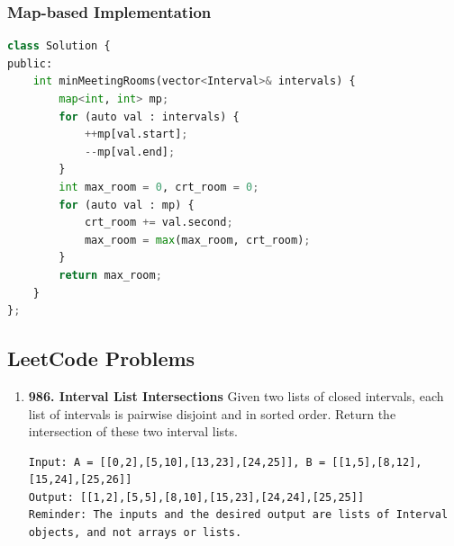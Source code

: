\documentclass[../../main.tex]{subfiles}
\begin{document}
\subsubsection{Map-based Implementation}


\begin{lstlisting}[language=Python]
class Solution {
public:
    int minMeetingRooms(vector<Interval>& intervals) {
        map<int, int> mp;
        for (auto val : intervals) {
            ++mp[val.start];
            --mp[val.end];
        }
        int max_room = 0, crt_room = 0;
        for (auto val : mp) {
            crt_room += val.second;
            max_room = max(max_room, crt_room);
        }
        return max_room;
    }
};
\end{lstlisting}

\subsection{LeetCode Problems}
\begin{enumerate}
 \item \textbf{986. Interval List Intersections} Given two lists of closed intervals, each list of intervals is pairwise disjoint and in sorted order. Return the intersection of these two interval lists.
\begin{lstlisting}[numbers=none]
Input: A = [[0,2],[5,10],[13,23],[24,25]], B = [[1,5],[8,12],[15,24],[25,26]]
Output: [[1,2],[5,5],[8,10],[15,23],[24,24],[25,25]]
Reminder: The inputs and the desired output are lists of Interval objects, and not arrays or lists.
\end{lstlisting}
\end{enumerate}
\end{document}

